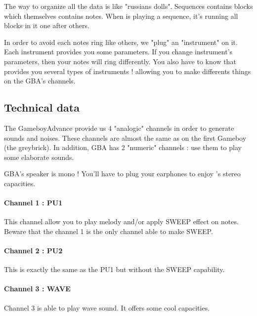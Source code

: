 The way to organize all the data is like "russians dolls". Sequences contains blocks which themselves contains notes.
When \FAT is playing a sequence, it's running all blocks in it one after others.

In order to avoid each notes ring like others, we "plug" an "instrument" on it.
Each instrument provides you some parameters.
If you change instrument's parameters, then your notes will ring differently.
You also have to know that \FAT provides you several types of instruments ! allowing you to make differents things on the GBA's channels.

\subsection{Technical data}

The GameboyAdvance provide us 4 "analogic" channels in order to generate sounds and noises.
These channels are almost the same as on the first Gameboy (the greybrick).
In addition, GBA has 2 "numeric" channels : use them to play some elaborate sounds.

GBA's speaker is mono ! You'll have to plug your earphones to enjoy \FAT's stereo capacities.

\paragraph{Channel 1 : PU1} This channel allow you to play melody and/or apply SWEEP effect on notes. Beware that the channel 1 is the only channel able to make SWEEP.


\paragraph{Channel 2 : PU2} This is exactly the same as the PU1 but without the SWEEP capability.


\paragraph{Channel 3 : WAVE} Channel 3 is able to play wave sound. It offers some cool capacities.


